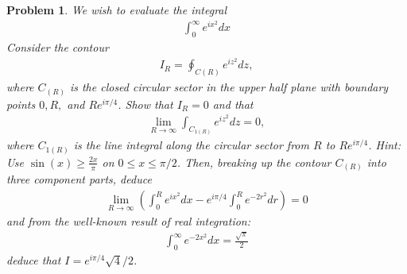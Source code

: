 \documentclass[12pt]{report}
\newtheorem{problem}{Problem}
\begin{document}
\begin{problem}
    We wish to evaluate the integral 
    \begin{align*}
        \int_0^\infty e^{ix^2}dx
    \end{align*}
    Consider the contour
    \begin{align*}
        I_R = \oint_{C(R)}e^{iz^2}dz,
    \end{align*}
    where $C_{(R)}$ is the closed circular sector in the upper half plane with boundary points $0,R,$ and
    $Re^{i\pi/4}$. Show that $I_R = 0$ and that
    \begin{align*}
        \lim_{R \rightarrow \infty} \int_{C_{1(R)}} e^{iz^2} dz = 0,
    \end{align*}
    where $C_{1(R)}$ is the line integral along the circular sector from $R$ to $Re^{i\pi/4}$. Hint: Use $\sin(x) \geq \frac{2x}{\pi}$ on $0 \leq x \leq \pi/2$.
    Then, breaking up the contour $C_{(R)}$ into three component parts, deduce
    \begin{align*}
        \lim_{R \rightarrow \infty} \left( \int_0^R e^{ix^2}dx - e^{i\pi/4} \int_0^R e^{-2r^2}dr \right) = 0
    \end{align*}
    and from the well-known result of real integration:
    \begin{align*}
        \int_0^\infty e^{-2x^2}dx = \frac{\sqrt{\pi}}{2}
    \end{align*}
    deduce that $I = e^{i\pi/4}\sqrt{4}/2$.
\end{problem}
\end{document}
